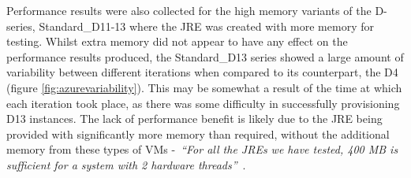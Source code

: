 \documentclass{llncs}
\begin{document}
Performance results were also collected for the high memory variants of the D-series, Standard\_D11-13 where the JRE was created with more memory for testing. Whilst extra memory did not appear to have any effect on the performance results produced, the Standard\_D13 series showed a large amount of variability between different iterations when compared to its counterpart, the D4 (figure \ref{fig:azurevariability}). This may be somewhat a result of the time at which each iteration took place, as there was some difficulty in successfully provisioning D13 instances. The lack of performance benefit is likely due to the JRE being provided with significantly more memory than required, without the additional memory from these types of VMs -~\emph{``For all the JREs we have tested, 400 MB is sufficient for a system with 2 hardware threads''}~\cite{specjvmguide}.
\end{document}
